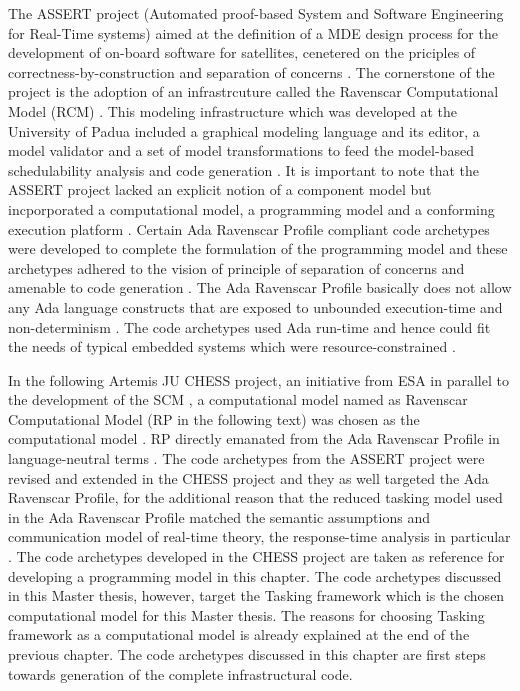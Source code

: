 The ASSERT project (Automated proof-based System and Software Engineering for Real-Time systems) aimed at the definition of a MDE design process for the development of on-board software for satellites, cenetered on the priciples of correctness-by-construction and separation of concerns \cite{PhdThesis}. The cornerstone of the project is the adoption of an infrastrcuture called the Ravenscar Computational Model (RCM) \cite{PhdThesis}. This modeling infrastructure which was developed at the University of Padua \cite{ScheduAnaly} included a graphical modeling language and its editor, a model validator and a set of model transformations to feed the model-based schedulability analysis and code generation \cite{ScheduAnaly}. It is important to note that the ASSERT project lacked an explicit notion of a component model but incporporated a computational model, a programming model and a conforming execution platform \cite{PhdThesis}. Certain Ada Ravenscar Profile compliant code archetypes were developed to complete the formulation of the programming model and these archetypes adhered to the vision of principle of separation of concerns and amenable to code generation \cite{CharEvoRAVCodeAr}. The Ada Ravenscar Profile basically does not allow any Ada language constructs that are exposed to unbounded execution-time and non-determinism \cite{RAVCodeAr}. The code archetypes used Ada run-time and hence could fit the needs of typical embedded systems which were resource-constrained \cite{RAVCodeAr}.   

In the following Artemis JU CHESS project, an initiative from ESA in parallel to the development of the SCM \cite{CompBasedProcess, PhdThesis}, a computational model named as Ravenscar Computational Model (RP in the following text) was chosen as the computational model \cite{ScheduAnaly}. RP directly emanated from the Ada Ravenscar Profile in language-neutral terms \cite{CharEvoRAVCodeAr,EvoRAVCodeAr}. The code archetypes from the ASSERT project were revised and extended in the CHESS project and they as well targeted the Ada Ravenscar Profile, for the additional reason that the reduced tasking model used in the Ada Ravenscar Profile matched the semantic assumptions and communication model of real-time theory, the response-time analysis in particular \cite{CharEvoRAVCodeAr}. The code archetypes developed in the CHESS project \cite{EvoRAVCodeAr} are taken as reference for developing a programming model in this chapter. The code archetypes discussed in this Master thesis, however, target the Tasking framework which is the chosen computational model for this Master thesis. The reasons for choosing Tasking framework as a computational model is already explained at the end of the previous chapter. The code archetypes discussed in this chapter are first steps towards generation of the complete infrastructural code. 


